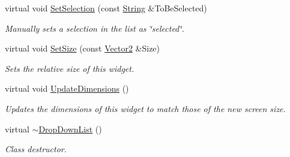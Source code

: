 \begin{DoxyCompactItemize}
virtual void \hyperlink{classMezzanine_1_1UI_1_1DropDownList_ae65a61e7a199b75b80805cbcd6fb979a}{SetSelection} (const \hyperlink{namespaceMezzanine_acf9fcc130e6ebf08e3d8491aebcf1c86}{String} \&ToBeSelected)
\begin{DoxyCompactList}\small\item\em Manually sets a selection in the list as \char`\"{}selected\char`\"{}. \item\end{DoxyCompactList}\item 
virtual void \hyperlink{classMezzanine_1_1UI_1_1DropDownList_af9a2fa5e0631162995826326e66108ec}{SetSize} (const \hyperlink{classMezzanine_1_1Vector2}{Vector2} \&Size)
\begin{DoxyCompactList}\small\item\em Sets the relative size of this widget. \item\end{DoxyCompactList}\item 
virtual void \hyperlink{classMezzanine_1_1UI_1_1DropDownList_aeb27e8fc8b99e7c627f53efbddcb4fb3}{UpdateDimensions} ()
\begin{DoxyCompactList}\small\item\em Updates the dimensions of this widget to match those of the new screen size. \item\end{DoxyCompactList}\item 
\hypertarget{classMezzanine_1_1UI_1_1DropDownList_a236fbd4bb8f5f2e32653fdedceab4fb5}{
virtual \hyperlink{classMezzanine_1_1UI_1_1DropDownList_a236fbd4bb8f5f2e32653fdedceab4fb5}{$\sim$DropDownList} ()}
\label{classMezzanine_1_1UI_1_1DropDownList_a236fbd4bb8f5f2e32653fdedceab4fb5}

\begin{DoxyCompactList}\small\item\em Class destructor. \item\end{DoxyCompactList}\end{DoxyCompactItemize}
